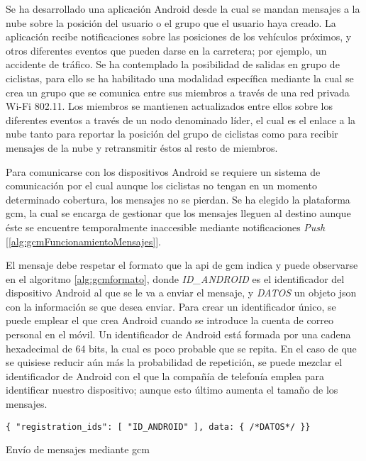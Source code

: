 Se ha desarrollado una aplicación Android desde la cual se mandan mensajes
a la nube sobre la posición del usuario o el grupo que el usuario haya
creado. La aplicación recibe notificaciones sobre las posiciones de los
vehículos próximos, y otros diferentes eventos que pueden darse en la
carretera; por ejemplo, un accidente de tráfico. Se ha contemplado la
posibilidad de salidas en grupo de ciclistas, para ello se ha habilitado una
modalidad específica mediante la cual se crea un grupo que se comunica entre
sus miembros a través de una red privada Wi-Fi 802.11. Los miembros se
mantienen actualizados entre ellos sobre los diferentes eventos a través de un
nodo denominado líder, el cual es el enlace a la nube tanto para reportar la
posición del grupo de ciclistas como para recibir mensajes de la nube y
retransmitir éstos al resto de miembros.

Para comunicarse con los dispositivos Android se requiere un sistema de
comunicación por el cual aunque los ciclistas no tengan en un momento
determinado cobertura, los mensajes no se pierdan. Se ha elegido la plataforma
\gls{gcm}, la cual se encarga de gestionar que los mensajes lleguen al destino
aunque éste se encuentre temporalmente inaccesible mediante notificaciones
\emph{Push} [\ref{alg:gcmFuncionamientoMensajes}].

El mensaje debe respetar el formato que la \gls{api} de \gls{gcm} indica y
puede observarse en el algoritmo \ref{alg:gcmformato}, donde \emph{ID\_ANDROID}
es el identificador del dispositivo Android al que se le va a enviar el
mensaje, y \emph{DATOS} un objeto \gls{json} con la información se que desea
enviar. Para crear un identificador único, se puede emplear el que crea Android
cuando se introduce la cuenta de correo personal en el móvil. Un identificador
de Android está formada por una cadena hexadecimal de 64 bits, la cual es poco
probable que se repita. En el caso de que se quisiese reducir aún más la
probabilidad de repetición, se puede mezclar el identificador de Android con
el que la compañía de telefonía emplea para identificar nuestro dispositivo;
aunque esto último aumenta el tamaño de los mensajes.

\begin{listing}
	\begin{minipage}{.4\textwidth}
		\begin{verbatim}
{ "registration_ids": [ "ID_ANDROID" ], data: { /*DATOS*/ }}
		\end{verbatim}
	\end{minipage}
	\caption{Envío de mensajes mediante \gls{gcm}}\label{alg:gcmformato}
\end{listing}

